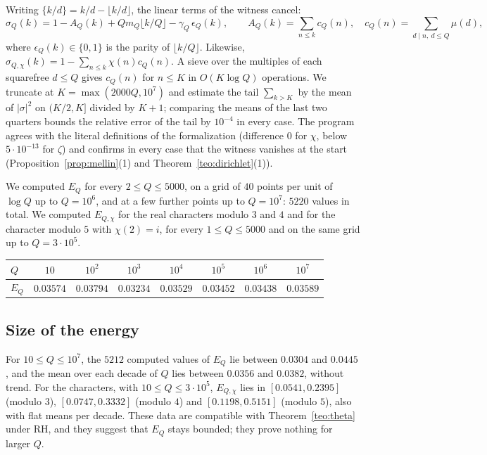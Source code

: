 \documentclass[11pt,a4paper]{amsart}
\theoremstyle{definition}
\theoremstyle{remark}
\begin{document}
Writing $\{k/d\}=k/d-\lfloor k/d\rfloor$, the linear terms of the witness cancel:
\[
\sigma_Q(k)=1-A_Q(k)+Qm_Q\lfloor k/Q\rfloor-\gamma_Q\,\epsilon_Q(k),\qquad
A_Q(k)=\sum_{n\le k}c_Q(n),\quad c_Q(n)=\sum_{d\mid n,\ d\le Q}\mu(d),
\]
where $\epsilon_Q(k)\in\{0,1\}$ is the parity of $\lfloor k/Q\rfloor$. Likewise, $\sigma_{Q,\chi}(k)=1-\sum_{n\le k}\chi(n)c_Q(n)$. A sieve over the multiples of each squarefree $d\le Q$ gives $c_Q(n)$ for $n\le K$ in $O(K\log Q)$ operations. We truncate at $K=\max(2000Q,10^7)$ and estimate the tail $\sum_{k>K}$ by the mean of $|\sigma|^2$ on $(K/2,K]$ divided by $K+1$; comparing the means of the last two quarters bounds the relative error of the tail by $10^{-4}$ in every case. The program agrees with the literal definitions of the formalization (difference $0$ for $\chi$, below $5\cdot10^{-13}$ for $\zeta$) and confirms in every case that the witness vanishes at the start (Proposition~\ref{prop:mellin}(1) and Theorem~\ref{teo:dirichlet}(1)).

We computed $E_Q$ for every $2\le Q\le5000$, on a grid of $40$ points per unit of $\log Q$ up to $Q=10^6$, and at a few further points up to $Q=10^7$: $5220$ values in total. We computed $E_{Q,\chi}$ for the real characters modulo $3$ and $4$ and for the character modulo $5$ with $\chi(2)=i$, for every $1\le Q\le5000$ and on the same grid up to $Q=3\cdot10^5$.

\begin{center}
\begin{tabular}{lccccccc}
\toprule
$Q$ & $10$ & $10^2$ & $10^3$ & $10^4$ & $10^5$ & $10^6$ & $10^7$\\
\midrule
$E_Q$ & $0.03574$ & $0.03794$ & $0.03234$ & $0.03529$ & $0.03452$ & $0.03438$ & $0.03589$\\
\bottomrule
\end{tabular}
\end{center}

\subsection*{Size of the energy}
For $10\le Q\le10^7$, the $5212$ computed values of $E_Q$ lie between $0.0304$ and $0.0445$, and the mean over each decade of $Q$ lies between $0.0356$ and $0.0382$, without trend. For the characters, with $10\le Q\le3\cdot10^5$, $E_{Q,\chi}$ lies in $[0.0541,0.2395]$ (modulo $3$), $[0.0747,0.3332]$ (modulo $4$) and $[0.1198,0.5151]$ (modulo $5$), also with flat means per decade. These data are compatible with Theorem~\ref{teo:theta} under RH, and they suggest that $E_Q$ stays bounded; they prove nothing for larger $Q$.
\end{document}
